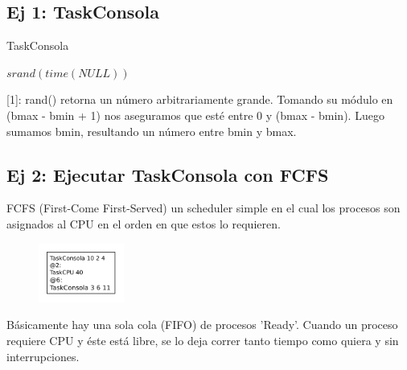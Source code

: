\subsection{Ej 1: TaskConsola}

\begin{algorithm}
 \caption{TaskConsola}
 \begin{algorithmic}[1]
   \State $srand(time(NULL))$ 
     \Comment{[1]}
   \EndFor
 \EndProcedure
 \end{algorithmic}
\end{algorithm}

[1]: rand() retorna un número arbitrariamente grande.
Tomando su módulo en (bmax - bmin + 1) nos aseguramos que esté entre 0 y (bmax - bmin).\newline
Luego sumamos bmin, resultando un número entre bmin y bmax.

\subsection{Ej 2: Ejecutar TaskConsola con FCFS}

FCFS (First-Come First-Served) un scheduler simple en el cual los procesos son asignados al CPU en el orden en que estos lo requieren.\newline

\begin{figure}
  \vspace{-30pt}
  \begin{center}
    \includegraphics[width=0.25\textwidth]{./ej1y2/ej2_loteTareas.png}
  \end{center}
   \vspace{-30pt}
\end{figure}

Básicamente hay una sola cola (FIFO) de procesos 'Ready'. 
Cuando un proceso requiere CPU y éste está libre, se lo deja correr tanto tiempo como quiera y sin interrupciones.\newline

